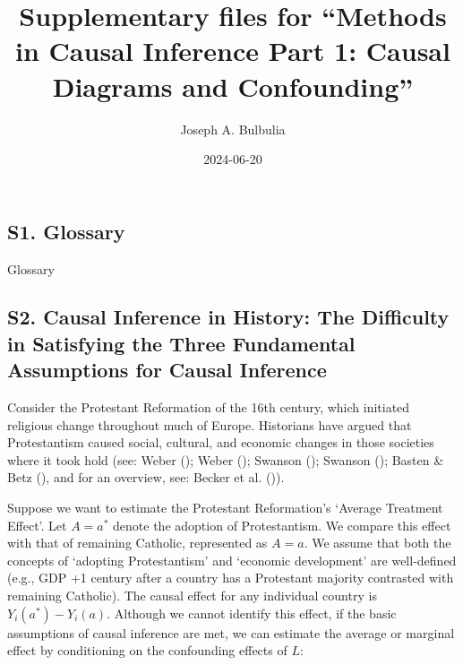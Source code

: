 \documentclass[
  single column]{article}
\title{Supplementary files for ``Methods in Causal Inference Part 1:
Causal Diagrams and Confounding''}
\author{Joseph A. Bulbulia}
\affil{%
             \small{     Victoria University of Wellington, New Zealand
          ORCID \textcolor[HTML]{A6CE39}{\aiOrcid} ~0000-0002-5861-2056 }
              }
\date{2024-06-20}
\renewcommand*\contentsname{Table of contents}
\newcommand\contentsname{Table of contents}
\begin{document}
\maketitle

\renewcommand*\contentsname{Table of contents}
{
\hypersetup{linkcolor=}
\setcounter{tocdepth}{2}
\tableofcontents
}
\listoftables
\newpage{}

\subsection{S1. Glossary}\label{id-app-a}

\begin{table}

\caption{\label{tbl-experiments}Glossary}

\centering{

\glossaryTerms

}

\end{table}%

\newpage{}

\subsection{S2. Causal Inference in History: The Difficulty in
Satisfying the Three Fundamental Assumptions for Causal
Inference}\label{id-app-b}

Consider the Protestant Reformation of the 16th century, which initiated
religious change throughout much of Europe. Historians have argued that
Protestantism caused social, cultural, and economic changes in those
societies where it took hold (see: Weber
(); Weber
(); Swanson
(); Swanson
(); Basten \& Betz
(), and for an overview, see: Becker et
al. ()).

Suppose we want to estimate the Protestant Reformation's `Average
Treatment Effect'. Let \(A = a^*\) denote the adoption of Protestantism.
We compare this effect with that of remaining Catholic, represented as
\(A = a\). We assume that both the concepts of `adopting Protestantism'
and `economic development' are well-defined (e.g., GDP +1 century after
a country has a Protestant majority contrasted with remaining Catholic).
The causal effect for any individual country is \(Y_i(a^*) - Y_i(a)\).
Although we cannot identify this effect, if the basic assumptions of
causal inference are met, we can estimate the average or marginal effect
by conditioning on the confounding effects of \(L\):
\end{document}
